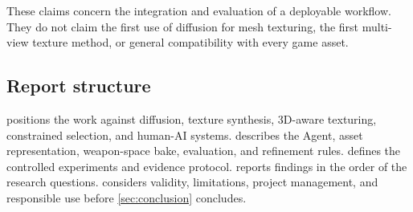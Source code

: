 These claims concern the integration and evaluation of a deployable workflow.
They do not claim the first use of diffusion for mesh texturing, the first
multi-view texture method, or general compatibility with every game asset.

\subsection{Report structure}

 positions the work against diffusion, texture synthesis,
3D-aware texturing, constrained selection, and human-AI systems.
 describes the Agent, asset representation, weapon-space bake,
evaluation, and refinement rules.  defines the controlled
experiments and evidence protocol.  reports findings in the
order of the research questions.  considers validity,
limitations, project management, and responsible use before
\cref{sec:conclusion} concludes.
